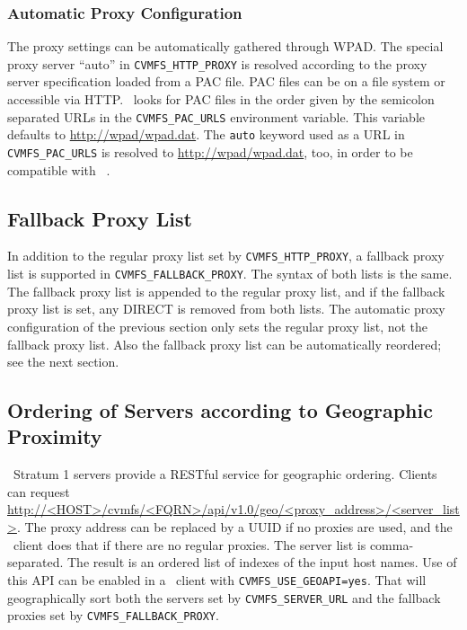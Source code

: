 \subsubsection{Automatic Proxy Configuration}
The proxy settings can be automatically gathered through WPAD.
The special proxy server ``auto'' in \texttt{CVMFS\_HTTP\_PROXY} is resolved according to the proxy server specification loaded from a PAC file.
PAC files can be on a file system or accessible via HTTP.
\cvmfs\ looks for PAC files in the order given by the semicolon separated URLs in the \texttt{CVMFS\_PAC\_URLS} environment variable.
This variable defaults to \url{http://wpad/wpad.dat}.
The \texttt{auto} keyword used as a URL in \texttt{CVMFS\_PAC\_URLS} is resolved to \url{http://wpad/wpad.dat}, too, in order to be compatible with ~\cite{frontier08}.

\subsection{Fallback Proxy List}
In addition to the regular proxy list set by \texttt{CVMFS\_HTTP\_PROXY}, a fallback proxy list is supported in \texttt{CVMFS\_FALLBACK\_PROXY}.
The syntax of both lists is the same. 
The fallback proxy list is appended to the regular proxy list, and if the fallback proxy list is set, any DIRECT is removed from both lists.
The automatic proxy configuration of the previous section only sets the regular proxy list, not the fallback proxy list.
Also the fallback proxy list can be automatically reordered; see the next section.

\subsection{Ordering of Servers according to Geographic Proximity}
\label{sct:geoapi}
\cvmfs\ Stratum 1 servers provide a RESTful service for geographic ordering.
Clients can request \url{http://<HOST>/cvmfs/<FQRN>/api/v1.0/geo/<proxy_address>/<server_list>}.
The proxy address can be replaced by a UUID if no proxies are used, and the \cvmfs\ client does that if there are no regular proxies.
The server list is comma-separated.
The result is an ordered list of indexes of the input host names.
Use of this API can be enabled in a \cvmfs\ client with \texttt{CVMFS\_USE\_GEOAPI=yes}.
That will geographically sort both the servers set by \texttt{CVMFS\_SERVER\_URL} and the fallback proxies set by \texttt{CVMFS\_FALLBACK\_PROXY}.

